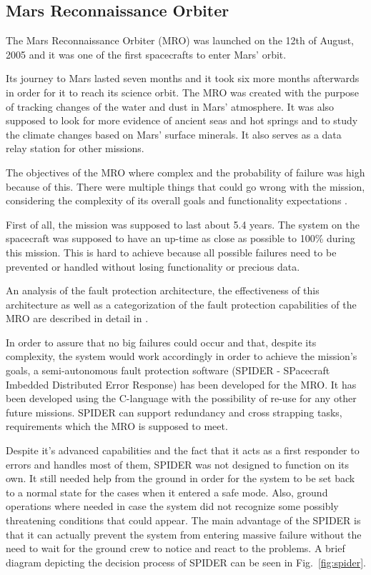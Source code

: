 \subsection{Mars Reconnaissance Orbiter}

The Mars Reconnaissance Orbiter (MRO)\cite{mro-nasa} was launched on the 12th of
August, 2005 and it was one of the first spacecrafts to enter Mars' orbit.

Its journey to Mars lasted seven months and it took six more months afterwards
in order for it to reach its science orbit. The MRO was created with the purpose
of tracking changes of the water and dust in Mars' atmosphere. It was also
supposed to look for more evidence of ancient seas and hot springs and to study
the climate changes based on Mars' surface minerals. It also serves as a data
relay station for other missions.

The objectives of the MRO where complex and the probability of failure was high
because of this. There were multiple things that could go wrong with the
mission, considering the complexity of its overall goals and functionality
expectations \cite{tvs}.

First of all, the mission was supposed to last about 5.4 years. The system on
the spacecraft was supposed to have an up-time as close as possible to 100\%
during this mission. This is hard to achieve because all possible failures need
to be prevented or handled without losing functionality or precious data.

An analysis of the fault protection architecture, the effectiveness of this
architecture as well as a categorization of the fault protection capabilities of
the MRO are described in detail in \cite{surv-nasa-mars}.

In order to assure that no big failures could occur and that, despite its
complexity, the system would work accordingly in order to achieve the mission's
goals, a semi-autonomous fault protection software (SPIDER - SPacecraft Imbedded
Distributed Error Response) has been developed for the MRO. It has been
developed using the C-language with the possibility of re-use for any other
future missions. SPIDER can support redundancy and cross strapping tasks,
requirements which the MRO is supposed to meet.

Despite it's advanced capabilities and the fact that it acts as a first
responder to errors and handles most of them, SPIDER was not designed to
function on its own. It still needed help from the ground in order for the
system to be set back to a normal state for the cases when it entered a safe
mode. Also, ground operations where needed in case the system did not recognize
some possibly threatening conditions that could appear. The main advantage of
the SPIDER is that it can actually prevent the system from entering massive
failure without the need to wait for the ground crew to notice and react to the
problems. A brief diagram depicting the decision process of SPIDER can be seen
in Fig.~\ref{fig:spider}.


